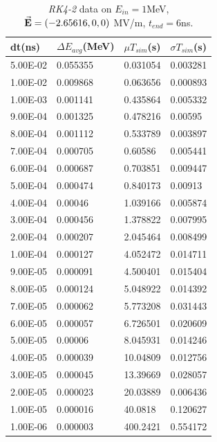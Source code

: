 \documentclass[a4paper,oneside,12pt]{report}
\numberwithin{equation}{chapter}
\begin{document}
{\begin{table}[H]
    \centering
    \caption{\textit{RK4-2} data on $E_{in}=1$MeV, $\vec{\textbf{E}}=(-2.65616, 0, 0)$ MV/m, $t_{end}=6$ns.}
    \vspace{10pt}
    \begin{tabular}{|l|l|l|l|}
    \hline
    dt(ns)       & $\Delta E_{avg}$(MeV) & $\mu T_{sim}$(s)    & $\sigma T_{sim}$(s) \\\hline
        5.00E-02 & 0.055355     & 0.031054 & 0.003281 \\\hline
        1.00E-02 & 0.009868     & 0.063656 & 0.000893 \\\hline
        1.00E-03 & 0.001141     & 0.435864 & 0.005332 \\\hline
        9.00E-04 & 0.001325     & 0.478216 & 0.00595  \\\hline
        8.00E-04 & 0.001112     & 0.533789 & 0.003897 \\\hline
        7.00E-04 & 0.000705     & 0.60586  & 0.005441 \\\hline
        6.00E-04 & 0.000687     & 0.703851 & 0.009447 \\\hline
        5.00E-04 & 0.000474     & 0.840173 & 0.00913  \\\hline
        4.00E-04 & 0.00046      & 1.039166 & 0.005874 \\\hline
        3.00E-04 & 0.000456     & 1.378822 & 0.007995 \\\hline
        2.00E-04 & 0.000207     & 2.045464 & 0.008499 \\\hline
        1.00E-04 & 0.000127     & 4.052472 & 0.014711 \\\hline
        9.00E-05 & 0.000091     & 4.500401 & 0.015404 \\\hline
        8.00E-05 & 0.000124     & 5.048922 & 0.014392 \\\hline
        7.00E-05 & 0.000062     & 5.773208 & 0.031443 \\\hline
        6.00E-05 & 0.000057     & 6.726501 & 0.020609 \\\hline
        5.00E-05 & 0.00006      & 8.045931 & 0.014246 \\\hline
        4.00E-05 & 0.000039     & 10.04809 & 0.012756 \\\hline
        3.00E-05 & 0.000045     & 13.39669 & 0.028057 \\\hline
        2.00E-05 & 0.000023     & 20.03889 & 0.006436 \\\hline
        1.00E-05 & 0.000016     & 40.0818  & 0.120627 \\\hline
        1.00E-06 & 0.000003     & 400.2421 & 0.554172 \\\hline 
    \end{tabular}
    \label{tab:rk2_statE_table}
\end{table}


}
\end{document}
